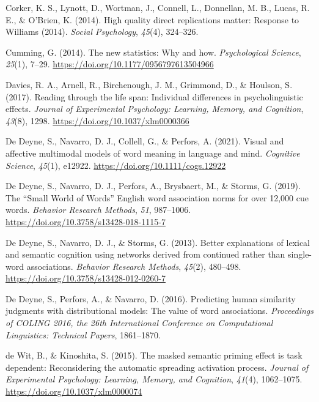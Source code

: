 \documentclass[
  12pt,
  man,floatsintext]{apa7}
\newlength{\cslhangindent}
\newlength{\cslentryspacingunit} %
\newenvironment{CSLReferences}[2] %
 {%
  \setlength{\parindent}{0pt}
  \ifodd #1
  \let\oldpar\par
  \def\par{\hangindent=\cslhangindent\oldpar}
  \fi
  \setlength{\parskip}{#2\cslentryspacingunit}
 }%
 {}
\begin{document}
\begin{CSLReferences}{1}{0}
\leavevmode{}%
Corker, K. S., Lynott, D., Wortman, J., Connell, L., Donnellan, M. B., Lucas, R. E., \& O'Brien, K. (2014). High quality direct replications matter: {Response} to {Williams} (2014). \emph{Social Psychology}, \emph{45}(4), 324--326.

\leavevmode{}%
Cumming, G. (2014). The new statistics: {Why} and how. \emph{Psychological Science}, \emph{25}(1), 7--29. \url{https://doi.org/10.1177/0956797613504966}

\leavevmode{}%
Davies, R. A., Arnell, R., Birchenough, J. M., Grimmond, D., \& Houlson, S. (2017). Reading through the life span: {Individual} differences in psycholinguistic effects. \emph{Journal of Experimental Psychology: Learning, Memory, and Cognition}, \emph{43}(8), 1298. \url{https://doi.org/10.1037/xlm0000366}

\leavevmode{}%
De Deyne, S., Navarro, D. J., Collell, G., \& Perfors, A. (2021). Visual and affective multimodal models of word meaning in language and mind. \emph{Cognitive Science}, \emph{45}(1), e12922. \url{https://doi.org/10.1111/cogs.12922}

\leavevmode{}%
De Deyne, S., Navarro, D. J., Perfors, A., Brysbaert, M., \& Storms, G. (2019). The {``{Small World} of {Words}''} {English} word association norms for over 12,000 cue words. \emph{Behavior Research Methods}, \emph{51}, 987--1006. \url{https://doi.org/10.3758/s13428-018-1115-7}

\leavevmode{}%
De Deyne, S., Navarro, D. J., \& Storms, G. (2013). Better explanations of lexical and semantic cognition using networks derived from continued rather than single-word associations. \emph{Behavior Research Methods}, \emph{45}(2), 480--498. \url{https://doi.org/10.3758/s13428-012-0260-7}

\leavevmode{}%
De Deyne, S., Perfors, A., \& Navarro, D. (2016). Predicting human similarity judgments with distributional models: {The} value of word associations. \emph{Proceedings of {COLING} 2016, the 26th International Conference on Computational Linguistics: {Technical} Papers}, 1861--1870.

\leavevmode{}%
de Wit, B., \& Kinoshita, S. (2015). The masked semantic priming effect is task dependent: {Reconsidering} the automatic spreading activation process. \emph{Journal of Experimental Psychology: Learning, Memory, and Cognition}, \emph{41}(4), 1062--1075. \url{https://doi.org/10.1037/xlm0000074}


\end{CSLReferences}
\end{document}
